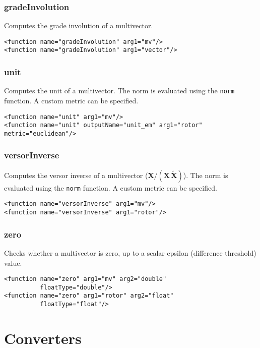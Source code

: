 \documentclass[10pt, a4paper]{article}
\newcommand{\gav}[1]{\ensuremath{\mathbf{#1}}}
\newcommand{\gp}{\,}
\newcommand{\rev}[1]{\widetilde{#1}}
\begin{document}
\subsubsection*{gradeInvolution}

Computes the grade involution of a multivector.
\begin{verbatim}
<function name="gradeInvolution" arg1="mv"/>
<function name="gradeInvolution" arg1="vector"/>
\end{verbatim}

\subsubsection*{unit}

Computes the unit of a multivector. The norm is evaluated using
the {\tt norm} function. A custom metric can be specified.
\begin{verbatim}
<function name="unit" arg1="mv"/>
<function name="unit" outputName="unit_em" arg1="rotor" metric="euclidean"/>
\end{verbatim}

\subsubsection*{versorInverse}

Computes the versor inverse of a multivector ($\gav{X} / (\gav{X} \gp \rev{\gav{X}})$). 
The norm is evaluated using the {\tt norm} function. A custom metric can be specified.
\begin{verbatim}
<function name="versorInverse" arg1="mv"/>
<function name="versorInverse" arg1="rotor"/>
\end{verbatim}


\subsubsection*{zero}

Checks whether a multivector is zero, up to a scalar epsilon (difference threshold) value.
\begin{verbatim}
<function name="zero" arg1="mv" arg2="double" 
          floatType="double"/>
<function name="zero" arg1="rotor" arg2="float" 
          floatType="float"/>
\end{verbatim}


\section{Converters}
\label{s:converters}
\end{document}
